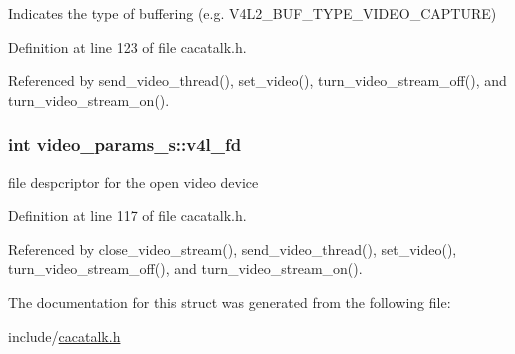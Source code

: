 \-Indicates the type of buffering (e.\-g. \-V4\-L2\-\_\-\-B\-U\-F\-\_\-\-T\-Y\-P\-E\-\_\-\-V\-I\-D\-E\-O\-\_\-\-C\-A\-P\-T\-U\-R\-E) 



\-Definition at line 123 of file cacatalk.\-h.



\-Referenced by send\-\_\-video\-\_\-thread(), set\-\_\-video(), turn\-\_\-video\-\_\-stream\-\_\-off(), and turn\-\_\-video\-\_\-stream\-\_\-on().

\hypertarget{structvideo__params__s_a5ad62fa189f34607d1dbb4e693a81cfd}{
\subsubsection[{v4l\-\_\-fd}]{\setlength{\rightskip}{0pt plus 5cm}int {\bf video\-\_\-params\-\_\-s\-::v4l\-\_\-fd}}}\label{structvideo__params__s_a5ad62fa189f34607d1dbb4e693a81cfd}


file despcriptor for the open video device 



\-Definition at line 117 of file cacatalk.\-h.



\-Referenced by close\-\_\-video\-\_\-stream(), send\-\_\-video\-\_\-thread(), set\-\_\-video(), turn\-\_\-video\-\_\-stream\-\_\-off(), and turn\-\_\-video\-\_\-stream\-\_\-on().



\-The documentation for this struct was generated from the following file\-:\begin{DoxyCompactItemize}
\item 
include/\hyperlink{cacatalk_8h}{cacatalk.\-h}\end{DoxyCompactItemize}
